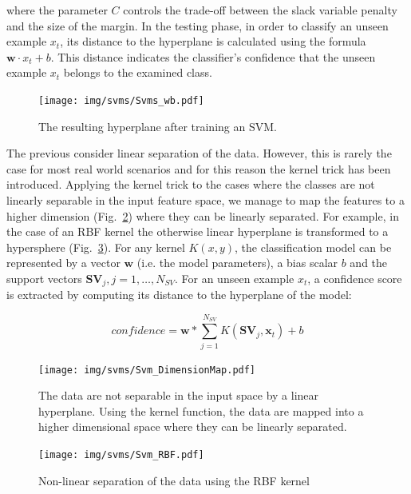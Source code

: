 \noindent where the parameter $C$ controls the trade-off between the
slack variable penalty and the size of the margin. In the testing
phase, in order to classify an unseen example $x_t$, its distance to
the hyperplane is calculated using the formula $\mathbf{w}\cdot x_t +
b$. This distance indicates the classifier's confidence that the
unseen example $x_t$ belongs to the examined class.

\begin{figure}[h]
\centering
  \texttt{[image: img/svms/Svms\_wb.pdf]}
  \caption{The resulting hyperplane after training an SVM.}
  \label{fig:svm_wb}
\end{figure}

The previous consider linear separation of the data. However, this is
rarely the case for most real world scenarios and for this reason the
kernel trick has been introduced. Applying the kernel trick to the
cases where the classes are not linearly separable in the input
feature space, we manage to map the features to a higher dimension
(Fig.~\ref{fig:svm_highDim}) where they can be linearly separated. For
example, in the case of an RBF kernel the otherwise linear hyperplane
is transformed to a hypersphere (Fig.~\ref{fig:svm_rbf}). For any
kernel $K(x,y)$, the classification model can be represented by a
vector $\textbf{w}$ (i.e. the model parameters), a bias scalar $b$ and
the support vectors $\mathbf{SV}_j, j=1,\ldots,N_{SV}$. For an unseen
example $x_t$, a confidence score is extracted by computing its
distance to the hyperplane of the model:

\begin{equation}\label{Eq:SVMdecision}
  confidence = \mathbf{w}*\sum_{j=1}^{N_{SV}}{K(\mathbf{SV}_j,\mathbf{x}_t)}+b
\end{equation}

\begin{figure}[h]
\centering
  \texttt{[image: img/svms/Svm\_DimensionMap.pdf]}
  \caption{The data are not separable in the input space by a linear hyperplane. Using the kernel function, the data are mapped into a higher dimensional space where they can be linearly separated.}
  \label{fig:svm_highDim}
\end{figure}

\begin{figure}[h]
\centering
  \texttt{[image: img/svms/Svm\_RBF.pdf]}
  \caption{Non-linear separation of the data using the RBF kernel}
  \label{fig:svm_rbf}
\end{figure}


